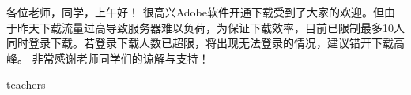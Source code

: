 \begin{cnabstract}
	各位老师，同学，上午好！
	很高兴Adobe软件开通下载受到了大家的欢迎。但由于昨天下载流量过高导致服务器难以负荷，为保证下载效率，目前已限制最多10人同时登录下载。若登录下载人数已超限，将出现无法登录的情况，建议错开下载高峰。
	非常感谢老师同学们的谅解与支持！
	
\end{cnabstract}


\begin{enabstract}
teachers






\end{enabstract}
